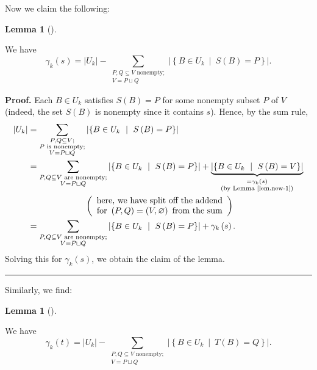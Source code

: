 \documentclass[numbers=enddot,12pt,final,onecolumn,notitlepage]{scrartcl}%
\theoremstyle{definition}
\newtheorem{lem}[theo]{Lemma}
\newenvironment{lemma}[1][]
{\begin{lem}[#1]\begin{leftbar}}
{\end{leftbar}\end{lem}}
\newenvironment{proof}[1][Proof]{\noindent\textbf{#1.} }{\ \rule{0.5em}{0.5em}}
\let\sumnonlimits\sum
\renewcommand{\sum}{\sumnonlimits\limits}
\theoremstyle{plainsl}
\begin{document}
Now we claim the following:

\begin{lemma}
\label{lem.new1} We have%
\[
\gamma_{k}\left(  s\right)  =\left\vert U_{k}\right\vert -\sum
_{\substack{P,Q\subseteq V\text{ nonempty;}\\V=P\sqcup Q}}\left\vert \left\{
B\in U_{k}\ \mid\ S\left(  B\right)  =P\right\}  \right\vert .
\]

\end{lemma}

\begin{proof}
Each $B\in U_{k}$ satisfies $S\left(  B\right)  =P$ for some nonempty subset
$P$ of $V$ (indeed, the set $S\left(  B\right)  $ is nonempty since it
contains $s$). Hence, by the sum rule,%
\begin{align*}
\left\vert U_{k}\right\vert  &  =\sum_{\substack{P,Q\subseteq V;\\P\text{ is
nonempty;}\\V=P\sqcup Q}}\left\vert \left\{  B\in U_{k}\ \mid\ S\left(
B\right)  =P\right\}  \right\vert \\
&  =\sum_{\substack{P,Q\subseteq V\text{ are nonempty;}\\V=P\sqcup
Q}}\left\vert \left\{  B\in U_{k}\ \mid\ S\left(  B\right)  =P\right\}
\right\vert +\underbrace{\left\vert \left\{  B\in U_{k}\ \mid\ S\left(
B\right)  =V\right\}  \right\vert }_{\substack{=\gamma_{k}\left(  s\right)
\\\text{(by Lemma \ref{lem.new-1})}}}\\
&  \ \ \ \ \ \ \ \ \ \ \ \ \ \ \ \ \ \ \ \ \left(
\begin{array}
[c]{c}%
\text{here, we have split off the addend}\\
\text{for }\left(  P,Q\right)  =\left(  V,\varnothing\right)  \text{ from the
sum}%
\end{array}
\right)  \\
&  =\sum_{\substack{P,Q\subseteq V\text{ are nonempty;}\\V=P\sqcup
Q}}\left\vert \left\{  B\in U_{k}\ \mid\ S\left(  B\right)  =P\right\}
\right\vert +\gamma_{k}\left(  s\right)  .
\end{align*}
Solving this for $\gamma_{k}\left(  s\right)  $, we obtain the claim of the lemma.
\end{proof}

Similarly, we find:

\begin{lemma}
\label{lem.new2}We have%
\[
\gamma_{k}\left(  t\right)  =\left\vert U_{k}\right\vert -\sum
_{\substack{P,Q\subseteq V\text{ nonempty;}\\V=P\sqcup Q}}\left\vert \left\{
B\in U_{k}\ \mid\ T\left(  B\right)  =Q\right\}  \right\vert .
\]

\end{lemma}
\end{document}
